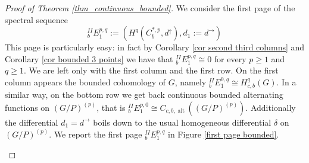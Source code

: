 \documentclass[a4paper]{amsart}
\theoremstyle{definition}
\theoremstyle{remark}
\theoremstyle{TheoremNum}
\DeclareMathOperator{\C}{\mathrm{C}} %
\DeclareMathOperator{\alt}{\mathrm{alt}}
\begin{document}
\begin{proof}[Proof of Theorem \ref{thm_continuous_bounded}]
We consider the first page of the spectral sequence 
$$
^{II}_bE^{p,q}_1:=(H^q(C^{\ast,p}_b,d^\uparrow),d_1:=d^\rightarrow)
$$
This page is particularly easy: in fact by Corollary \ref{cor second third columns} and Corollary \ref{cor bounded 3 points} we have that $^{II}_bE^{p,q}_1 \cong 0$ for every $p \geq 1$ and $q \geq 1$. We are left only with the first column and the first row. On the first column appears the bounded cohomology of $G$, namely
$^{II}_bE^{0,q}_1 \cong H_{c,b}^q(G)$. In a similar way, on the bottom row we get back continuous bounded alternating functions on $(G/P)^{(p)}$, that is
$^{II}_bE^{p,0}_1 \cong C_{c,b,\alt}((G/P)^{(p)})$. Additionally the differential $d_1=d^\rightarrow$ boils down to the usual homogeneous differential $\delta$ on $(G/P)^{(p)}$. We report the first page $^{II}_bE^{p,q}_1$ in Figure \ref{first page bounded}.

\begin{figure}[!h]
\centering
{}
\end{figure}
\end{proof}
\end{document}
